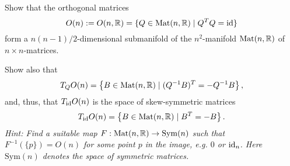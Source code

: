 \begin{exercise}\label{exe:onsubmanifold}
  Show that the orthogonal matrices
  \begin{equation}
    O(n) := O(n, \mathbb{R}) = \{ Q\in \mathrm{Mat}(n, \mathbb{R}) \mid Q^TQ=\operatorname{id} \}
  \end{equation}
  form a $n(n-1)/2$-dimensional submanifold of the $n^2$-manifold $\mathrm{Mat}(n, \mathbb{R})$ of $n\times n$-matrices.

  Show also that
  \begin{equation}
    T_Q O(n) = \left\lbrace B \in \mathrm{Mat}(n, \mathbb{R}) \mid (Q^{-1} B)^T = -Q^{-1}B \right\rbrace,
  \end{equation}
  and, thus, that $T_{\operatorname{id}} O(n)$ is the space of skew-symmetric matrices
  \begin{equation}
    T_{\operatorname{id}} O(n) = \left\{ B \in \mathrm{Mat}(n, \mathbb{R}) \mid B^T = -B \right\}.
  \end{equation}
  \textit{\small Hint: Find a suitable map $F: \mathrm{Mat}(n, \mathbb{R}) \to \mathrm{Sym}(n)$ such that $F^{-1}(\{p\}) = O(n)$ for some point $p$ in the image, e.g. $0$ or $\operatorname{id}_n$.
    Here $\mathrm{Sym}(n)$ denotes the space of symmetric matrices.}
\end{exercise}

